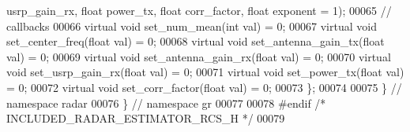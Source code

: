 \begin{DoxyCode}
       usrp\_gain\_rx, \textcolor{keywordtype}{float} power\_tx, \textcolor{keywordtype}{float} corr\_factor, \textcolor{keywordtype}{float} exponent = 1);
00065       \textcolor{comment}{// callbacks}
00066       \textcolor{keyword}{virtual} \textcolor{keywordtype}{void} set\_num\_mean(\textcolor{keywordtype}{int} val) = 0;
00067       \textcolor{keyword}{virtual} \textcolor{keywordtype}{void} set\_center\_freq(\textcolor{keywordtype}{float} val) = 0;
00068       \textcolor{keyword}{virtual} \textcolor{keywordtype}{void} set\_antenna\_gain\_tx(\textcolor{keywordtype}{float} val) = 0;
00069       \textcolor{keyword}{virtual} \textcolor{keywordtype}{void} set\_antenna\_gain\_rx(\textcolor{keywordtype}{float} val) = 0;
00070       \textcolor{keyword}{virtual} \textcolor{keywordtype}{void} set\_usrp\_gain\_rx(\textcolor{keywordtype}{float} val) = 0;
00071       \textcolor{keyword}{virtual} \textcolor{keywordtype}{void} set\_power\_tx(\textcolor{keywordtype}{float} val) = 0;
00072       \textcolor{keyword}{virtual} \textcolor{keywordtype}{void} set\_corr\_factor(\textcolor{keywordtype}{float} val) = 0;
00073     \};
00074 
00075   \} \textcolor{comment}{// namespace radar}
00076 \} \textcolor{comment}{// namespace gr}
00077 
00078 \textcolor{preprocessor}{#endif }\textcolor{comment}{/* INCLUDED\_RADAR\_ESTIMATOR\_RCS\_H */}\textcolor{preprocessor}{}
00079 
\end{DoxyCode}
